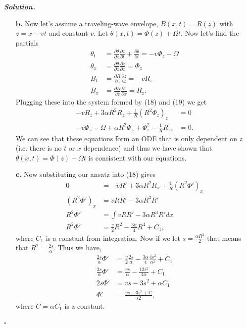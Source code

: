 \documentclass[12pt]{report}
\newenvironment{solution}[1][\it{Solution}]{\textbf{#1. } }{$\square$}
\newcommand{\paren}[1]{{\left(#1\right)}} %
\newcommand{\pp}[2]{\frac{\partial #1}{\partial #2}} %
\begin{document}
\begin{solution}
\begin{enumerate}
        \item[{\bf b.}]
        Now let's assume a traveling-wave envelope, $B(x,t) = R(z)$ with $z = x - vt$ and constant $v$. Let $\theta(x,t) =\Phi(z) + \Omega t$. Now let's find the partials
        \begin{align*}
            \theta_t &= \pp{\theta}{z}\pp{z}{t} + \pp{\theta}{t} = -v\Phi_z - \Omega\\
            \theta_x &= \pp{\theta}{z}\pp{z}{x} = \Phi_z\\
            B_t &= \pp{R}{z}\pp{z}{t} = -vR_z\\
            B_x &= \pp{R}{z}\pp{z}{x} = R_z.
        \end{align*}
        Plugging these into the system formed by (18) and (19) we get
        \begin{align*}
            -vR_z + 3 \alpha R^2R_z + \frac{1}{R}\paren{R^2\Phi_z}_z &= 0\\
            -v\Phi_z - \Omega + \alpha R^2\Phi_z + \Phi_z^2 - \frac{1}{R}R_{zz} &= 0.
        \end{align*}
        We can see that these equations form an ODE that is only dependent on $z$ (i.e. there is no $t$ or $x$ dependence) and thus we have shown that $\theta(x,t) =\Phi(z) + \Omega t$ is consistent with our equations.


        \item[{\bf c.}]
        Now substituting our ansatz into (18) gives
        \begin{align*}
            0 &= -vR' + 3\alpha R^2 R_x + \frac{1}{R}(R^2 \Phi')_x\\
            (R^2 \Phi')_x &= vRR' - 3 \alpha R^3 R'\\
            R^2 \Phi' &= \int vRR'- 3 \alpha R^3 R'dx\\
            R^2 \Phi' &=  \frac{v}{2}R^2 - \frac{3\alpha}{4}R^4 + C_1,
        \end{align*}
        where $C_1$ is a constant from integration. Now if we let $s = \frac{\alpha R^2}{2}$ that means that $R^2 = \frac{2s}{\alpha}$. Thus we have,
        \begin{align*}
            \frac{2s}{\alpha}\Phi' &= \frac{v}{2}\frac{2s}{\alpha} - \frac{3\alpha}{4} \frac{4s^2}{\alpha^2} + C_1\\
            \frac{2s}{\alpha}\Phi' &= \frac{vs}{\alpha} - \frac{12s^2}{4\alpha} + C_1\\
            2s \Phi' &= vs - 3s^2 + \alpha C_1\\
            \Phi' &= \frac{vs - 3s^2 + C}{s2},
        \end{align*}
        where $C = \alpha C_1$ is a constant.


\end{enumerate}
\end{solution}
\end{document}

